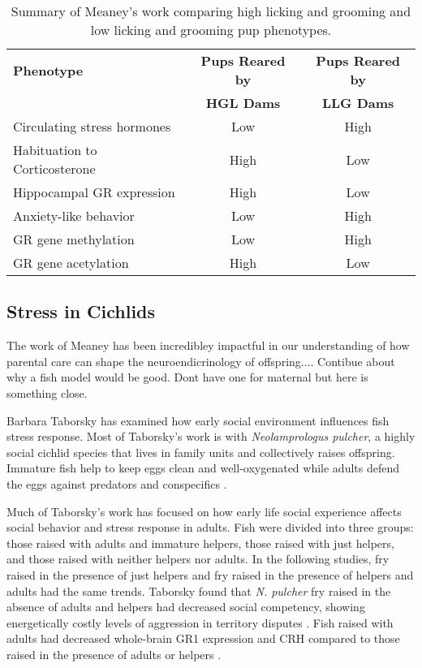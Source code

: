 \documentclass[12pt,twoside]{reedthesis}
\begin{document}
\begin{table}[htbp]
\caption[Summary of Meaney's work comparing high licking and grooming and low licking and grooming
pup phenotypes]{Summary of Meaney's work comparing high licking and grooming and low licking and grooming
pup phenotypes.}
\begin{center}
\footnotesize
\begin{tabular}{ | l | c | c | }
  \hline
  \textbf{Phenotype} & \textbf{Pups Reared by} & \textbf{Pups Reared by} \\
  & \textbf{HGL Dams} & \textbf{LLG Dams} \\
\hline
 Circulating stress hormones & Low & High\\
\hline
 Habituation to Corticosterone  & High & Low\\
\hline
  Hippocampal GR expression & High & Low\\
\hline
  Anxiety-like behavior & Low & High\\
\hline
  GR gene methylation & Low & High \\
\hline
  GR gene acetylation & High & Low \\
  \hline
\end{tabular}
\end{center}
\end{table}

\subsection{Stress in Cichlids}

The work of Meaney has been incredibley impactful in our understanding of how
parental care can shape the neuroendicrinology of offspring.... Contibue about
why a fish model would be good. Dont have one for maternal but here is something close.

Barbara Taborsky has examined how early social environment influences fish
stress response.
Most of Taborsky's work is with \textit{Neolamprologus pulcher}, a highly social cichlid species
that lives in family units and collectively raises offspring. Immature fish help
to keep eggs clean and well-oxygenated while adults defend the eggs against
predators and conspecifics \citep{arnold_social_2010}.

Much of Taborsky's work has focused on
how early life social experience affects social behavior and stress response in
adults. Fish were divided into three groups: those raised with adults and
immature helpers, those raised with just helpers, and those raised with neither
helpers nor adults. In the following studies, fry raised in the presence of just
helpers and fry raised in the presence of helpers and adults had the same
trends. Taborsky found that \textit{N. pulcher} fry raised in the
absence of adults and helpers had decreased social competency, showing
energetically costly levels of aggression in territory disputes \citep{arnold_social_2010}. Fish raised with adults had decreased whole-brain GR1
expression and CRH compared to those raised in the presence of adults or helpers
\citep{taborsky_stable_2012}.
\end{document}
